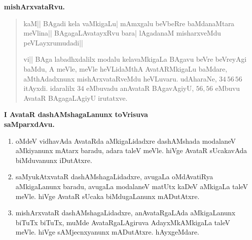 \begin{center}
{\bf mishArxvataRvu.}
\end{center}

\begin{verse}
kaM|| BAgadi kela vaMkigaLu| mAmxgalu beVbeRre baMdanaMtara meVlina|| BAgagaLAvatayxRvu bara| lAgadanaM misharxveMdu peVLayxrumudadi||

vi|| BAga labadhxdalilx modalu kelavaMkigaLa BAgavu beVre beVreyAgi baMdu, A meVle, meVle heVLidaMthA AvatARMkigaLu baMdare, aMthAdadxnunx mishArxvataRveMdu heVLuvaru. udAharaNe, $34\, 56\, 56$ itAyxdi. idaralilx $34$ eMbuvadu anAvataR BAgavAgiyU, $56, 56$ eMbuvu AvataR BAgagaLAgiyU irutatxve.
\end{verse}

\begin{center}
{\bf \large I AvataR dashAMshagaLanunx toVrisuva\\
 saMparxdAvu.}
\end{center}

\begin{enumerate}[\rm (1)]
\item oMdeV vidhavAda AvataRda aMkigaLidadxre dashAMshada modalaneV aMkiyanunx mAtarx baradu, adara taleV meVle. hiVge AvataR sUcakavAda biMduvanunx iDutAtxre.


\item saMyukAtxvataR dashAMshagaLidadxre, avugaLa oMdAvatiRya aMkigaLanunx baradu, avugaLa modalaneV matUtx kaDeV aMkigaLa taleV meVle. hiVge AvataR sUcaka biMdugaLanunx mADutAtxre.

\item mishArxvataR dashAMshagaLidadxre, anAvataRgaLAda aMkigaLanunx biTuTx biTuTx, muMde AvataRgaLAgiruva AdayxMkAMkigaLa taleV meVle. hiVge sAMjecnxyanunx mADutAtxre. \quad hAyxgeMdare.
\end{enumerate}

